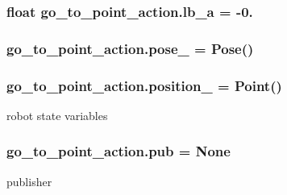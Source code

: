 \subsubsection[{\texorpdfstring{lb\+\_\+a}{lb_a}}]{\setlength{\rightskip}{0pt plus 5cm}float go\+\_\+to\+\_\+point\+\_\+action.\+lb\+\_\+a = -\/0.}\hypertarget{namespacego__to__point__action_ac93d2080cb249db79a1bba87a42c1a44}{}\label{namespacego__to__point__action_ac93d2080cb249db79a1bba87a42c1a44}
\subsubsection[{\texorpdfstring{pose\+\_\+}{pose_}}]{\setlength{\rightskip}{0pt plus 5cm}go\+\_\+to\+\_\+point\+\_\+action.\+pose\+\_\+ = Pose()}\hypertarget{namespacego__to__point__action_ac843a0e43a672ed873017530721ce2d9}{}\label{namespacego__to__point__action_ac843a0e43a672ed873017530721ce2d9}
\subsubsection[{\texorpdfstring{position\+\_\+}{position_}}]{\setlength{\rightskip}{0pt plus 5cm}go\+\_\+to\+\_\+point\+\_\+action.\+position\+\_\+ = Point()}\hypertarget{namespacego__to__point__action_a4aafc5721803ca4d208e9e0a686f8e65}{}\label{namespacego__to__point__action_a4aafc5721803ca4d208e9e0a686f8e65}


robot state variables 

\subsubsection[{\texorpdfstring{pub}{pub}}]{\setlength{\rightskip}{0pt plus 5cm}go\+\_\+to\+\_\+point\+\_\+action.\+pub = None}\hypertarget{namespacego__to__point__action_a3e555da71db618b9165bb58fe9ef160e}{}\label{namespacego__to__point__action_a3e555da71db618b9165bb58fe9ef160e}


publisher 

